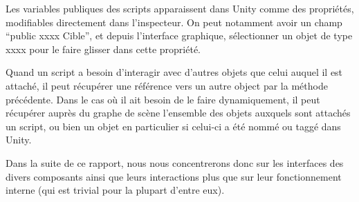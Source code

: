 Les variables publiques des scripts apparaissent dans Unity comme des propriétés, modifiables directement dans l'inspecteur. On peut notamment avoir un champ \enquote{public xxxx Cible}, et depuis l'interface graphique, sélectionner un objet de type xxxx pour le faire glisser dans cette propriété.

Quand un script a besoin d'interagir avec d'autres objets que celui auquel il est attaché, il peut récupérer une référence vers un autre  object par la méthode précédente. Dans le cas où il ait besoin de le faire dynamiquement, il peut récupérer auprès du graphe de scène l'ensemble des objets auxquels sont attachés un script, ou bien un objet en particulier si celui-ci a été nommé ou taggé dans Unity.

Dans la suite de ce rapport, nous nous concentrerons donc sur les interfaces des divers composants ainsi que leurs interactions plus que sur leur fonctionnement interne (qui est trivial pour la plupart d'entre eux).
